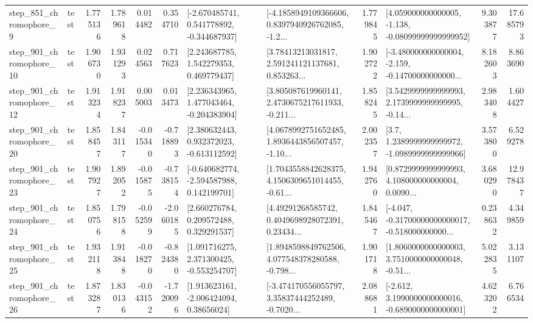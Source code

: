 \begin{tabular}{llrrrrllrlrr}
   step\_851\_chromophore\_9 &      test &      1.775136 &    1.789618 &      0.014482 &  0.354710 &   [-2.670485741, 0.541778892, -0.344687937] &  [-4.1858949109366606, 0.8397940926762085, -1.2... &       1.779845 &  [4.059000000000005, -1.138, -0.08099999999999952] &            9.303877 &         17.685793 \\
  step\_901\_chromophore\_10 &      test &      1.906730 &    1.931293 &      0.024563 &  0.717623 &     [2.243687785, 1.542279353, 0.469779437] &  [3.78413213031817, 2.591241121137681, 0.853263... &       1.902722 &  [-3.480000000000004, -2.159, -0.14700000000000... &            8.182603 &          8.863690 \\
  step\_901\_chromophore\_12 &      test &      1.913234 &    1.918237 &      0.005003 &  0.013473 &    [2.236343965, 1.477043464, -0.204383904] &  [3.805087619960141, 2.4730675217611933, -0.211... &       1.858245 &  [3.5429999999999993, 2.1739999999999995, -0.14... &            2.983408 &          1.604427 \\
  step\_901\_chromophore\_20 &      test &      1.858457 &    1.843117 &     -0.015340 & -0.718893 &    [2.380632443, 0.932372023, -0.613112592] &  [4.0678992751652485, 1.8936443856507457, -1.10... &       2.002357 &     [3.7, 1.2389999999999972, -1.0989999999999966] &            3.573800 &          6.529278 \\
  step\_901\_chromophore\_23 &      test &      1.907927 &    1.892052 &     -0.015875 & -0.738154 &   [-0.640682774, -2.594587988, 0.142199701] &  [1.7043558842628375, 4.1506309651014455, -0.61... &       1.942760 &  [0.8729999999999993, 4.108000000000004, 0.0090... &            3.680290 &         12.978437 \\
  step\_901\_chromophore\_24 &      test &      1.850756 &    1.798158 &     -0.052599 & -2.060185 &     [2.660276784, 0.209572488, 0.329291537] &  [4.49291268585742, 0.4049698928072391, 0.23434... &       1.845467 &  [-4.047, -0.31700000000000017, -0.518000000000... &            0.238632 &          4.349859 \\
  step\_901\_chromophore\_25 &      test &      1.932118 &    1.913848 &     -0.018270 & -0.824380 &    [1.091716275, 2.371300425, -0.553254707] &  [1.8948598849762506, 4.077548378280588, -0.798... &       1.901718 &  [1.8060000000000003, 3.7510000000000048, -0.51... &            5.022835 &          3.131107 \\
  step\_901\_chromophore\_26 &      test &      1.873287 &    1.830136 &     -0.043152 & -1.720096 &     [1.913623161, -2.006424094, 0.38656024] &  [-3.474170556055797, 3.35837444252489, -0.7020... &       2.088681 &  [-2.612, 3.1990000000000016, -0.6890000000000001] &            4.623202 &          6.766534 \\

\end{tabular}
